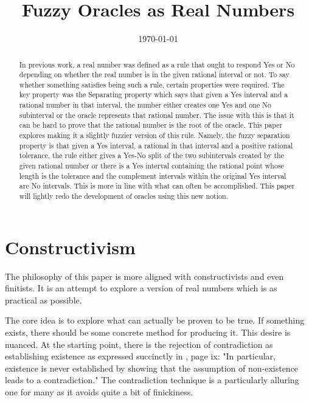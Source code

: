 \documentclass[12pt]{article}
\title{Fuzzy Oracles as Real Numbers}
\date{\today}
\begin{document}
\maketitle
\begin{abstract}
In previous work, a real number was defined as a rule that ought to respond Yes or No depending on whether the real number is in the given rational interval or not. To say whether something satisfies being such a rule, certain properties were required. The key property was the Separating property which says that given a Yes interval and a rational number in that interval, the number either creates one Yes and one No subinterval or the oracle represents that rational number. The issue with this is that it can be hard to prove that the rational number is the root of the oracle. This paper explores making it a slightly fuzzier version of this rule. Namely, the fuzzy separation property is that given a Yes interval, a rational in that interval and a positive rational tolerance, the rule either gives a Yes-No split of the two subintervals created by the given rational number or there is a Yes interval containing the rational point whose length is the tolerance and the complement intervals within the original Yes interval are No intervals. This is more in line with what can often be accomplished. This paper will lightly redo the development of oracles using this new notion. 
\end{abstract}

\tableofcontents

\section{Constructivism}\label{sec:ora}

The philosophy of this paper is more aligned with constructivists and even finitists. It is an attempt to explore a version of real numbers which is as practical as possible.

The core idea is to explore what can actually be proven to be true. If something exists, there should be some concrete method for producing it. This desire is nuanced. At the starting point, there is the rejection of contradiction as establishing existence as expressed succinctly in \cite{bridger}, page ix: "In particular, existence is never established by showing that the assumption of non-existence leads to a contradiction." The contradiction technique is a particularly alluring one for many as it avoids quite a bit of finickiness. 
\end{document}
